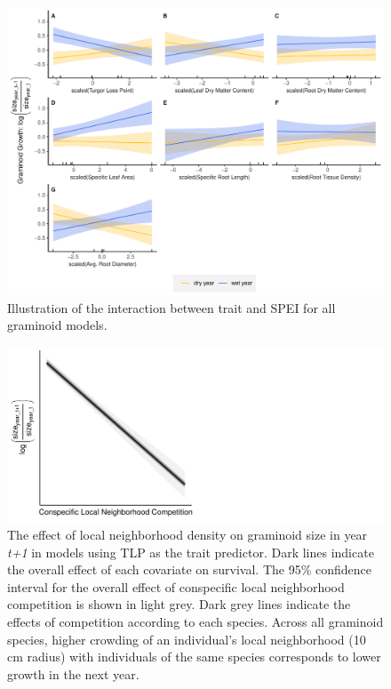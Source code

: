 \documentclass[12pt, letterpaper]{article}
\begin{document}
\begin{figure}
\includegraphics[width=1\textwidth]{images/AllTraitsGrowth.pdf}
\caption{\small{
Illustration of the interaction between trait and SPEI for all graminoid models.
}}
\label{fig:Growth_all}
\end{figure}

\begin{figure}
    \centering
    \includegraphics[width=.9\textwidth]{images/Effects_Growth.pdf}
    \caption{The effect of local neighborhood density on graminoid size in year \textit{t+1} in models using TLP as the trait predictor. Dark lines indicate the overall effect of each covariate on survival. The 95\% confidence interval for the overall effect of conspecific local neighborhood competition is shown in light grey. Dark grey lines indicate the effects of competition according to each species. Across all graminoid species, higher crowding of an individual's local neighborhood (10 cm radius) with individuals of the same species corresponds to lower growth in the next year.}
    \label{fig:Effects_Growth}
\end{figure}
\end{document}
